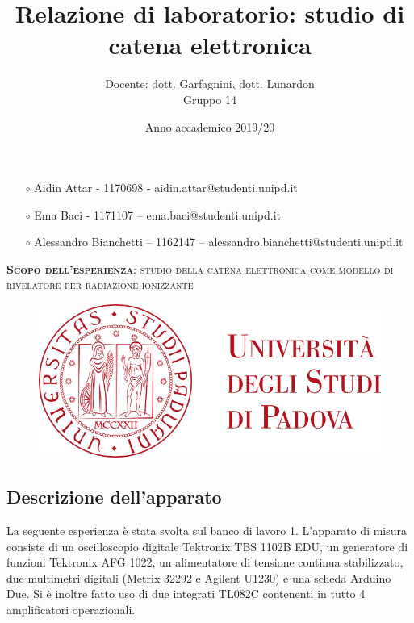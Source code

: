 \documentclass{article}
\title{Relazione di laboratorio: studio di catena elettronica}
\author{Docente: dott. Garfagnini, dott. Lunardon \\
Gruppo 14}
\date{Anno accademico 2019/20}
\begin{document}
\maketitle

\begin{itemize}
    \item[$\circ$] Aidin Attar - 1170698 - aidin.attar@studenti.unipd.it
    \item[$\circ$] Ema Baci - 1171107 – ema.baci@studenti.unipd.it
    \item[$\circ$] Alessandro Bianchetti – 1162147 – alessandro.bianchetti@studenti.unipd.it
\end{itemize}

\vspace{3 cm}
\begin{large}\textsc{\textbf{Scopo dell'esperienza}: studio della catena elettronica come modello di rivelatore per radiazione ionizzante} 
\end{large}
\vspace{8.5cm}

\begin{figure}[H]
\centering
\includegraphics[scale=0.5, angle=0]{unipd_logo.png}
\end{figure}


\twocolumn

\subsection*{Descrizione dell'apparato} La seguente esperienza è stata svolta sul banco di lavoro 1. L'apparato di misura consiste di 
un oscilloscopio digitale Tektronix TBS 1102B EDU, un generatore di funzioni Tektronix AFG 1022, un alimentatore di tensione continua stabilizzato,
due multimetri digitali (Metrix 32292 e Agilent U1230) e una scheda Arduino Due. 
Si è inoltre fatto uso di due integrati TL082C contenenti in tutto 4 amplificatori operazionali.
\end{document}
